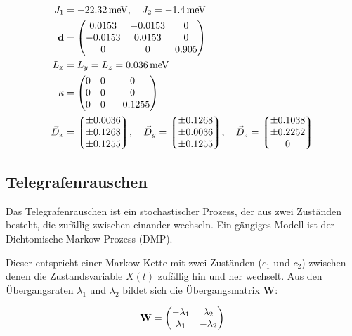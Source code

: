 \documentclass[main.tex]{subfiles}
\begin{document}
\begin{align}
	J_1             & = \SI{-22,32}{\milli\electronvolt}, \quad J_2 =
	\SI{-1,4}{\milli\electronvolt}
	\\
	\mathbf{d}      & = \mqty(
	\num{0.0153}    & \num{-0.0153}                                   & 0
	\\
	\num{-0.0153}   & \num{0.0153}                                    & 0
	\\
	0               & 0                                               &
	\num{0.905})                                                          \\
	L_x             & = L_y = L_z = \SI{0.036}{\milli\electronvolt}
	\\
	\mathbf{\kappa} & = \mqty(
	0               & 0                                               & 0
	\\
	0               & 0                                               & 0
	\\
	0               & 0                                               &
	\num{-0.1255})                                                        \\
	\vec{D}_x       & = \mqty*(\num{\pm 0.0036}
	\\ \num{\pm 0.1268} \\ \num{\pm
		0.1255}), \quad
	\vec{D}_y = \mqty*(\num{\pm 0.1268}
	\\ \num{\pm 0.0036} \\ \num{\pm
		0.1255}), \quad
	\vec{D}_z = \mqty*(\num{\pm 0.1038}
	\\ \num{\pm 0.2252} \\ 0)
\end{align}
\subsection{Telegrafenrauschen}

Das Telegrafenrauschen ist ein stochastischer Prozess, der aus zwei Zuständen
besteht, die zufällig zwischen einander wechseln. Ein gängiges Modell ist der
Dichtomische Markow-Prozess (DMP).

Dieser entspricht einer Markow-Kette mit zwei Zuständen (\(c_1\) und \(c_2\))
zwischen denen die Zustandsvariable \(X(t)\) zufällig hin und her wechselt. Aus
den Übergangsraten \(\lambda_1\) und \(\lambda_2\) bildet sich die
Übergangsmatrix \(\mathbf{W}\):

\begin{align}
	\mathbf{W} = \mqty(
	-\lambda_1 & \lambda_2   \\
	\lambda_1  & -\lambda_2)
\end{align}
\end{document}
